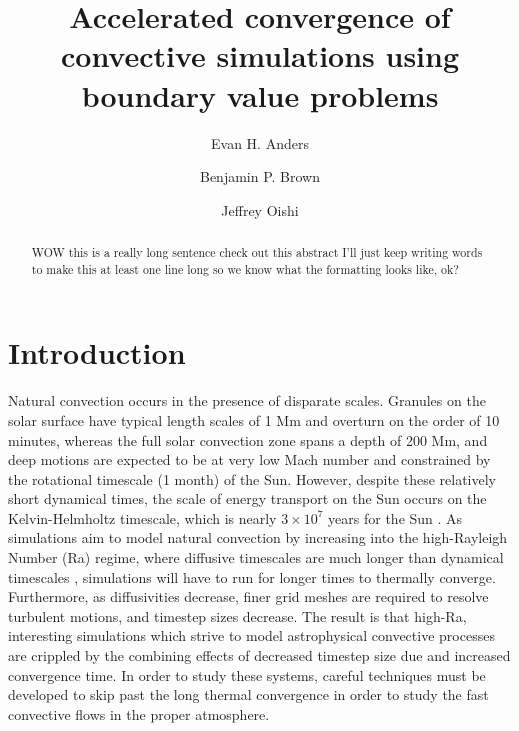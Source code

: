 \documentclass[aps, pre, onecolumn, nofootinbib, notitlepage, groupedaddress, amsfonts, amssymb, amsmath, longbibliography]{revtex4-1}
\begin{document}
\author{Evan H. Anders}
\author{Benjamin P. Brown}
\author{Jeffrey Oishi}
\title{Accelerated convergence of convective simulations using boundary value problems}

\begin{abstract}
WOW this is a really long sentence check out this abstract I'll just keep writing words to make this at least
one line long so we know what the formatting looks like, ok?
\end{abstract}
\maketitle


\section{Introduction}
\label{sec:intro}
Natural convection occurs in the presence of disparate scales. Granules on the
solar surface have typical length scales of 1 Mm and overturn on the order of 10 minutes, whereas
the full solar convection zone spans a depth of 200 Mm, and deep motions are expected to be at very
low Mach number and constrained by the rotational timescale (1 month) of the Sun.  
However, despite these relatively short dynamical times, the scale of energy transport on the
Sun occurs on the Kelvin-Helmholtz timescale, which is nearly $3 \times 10^7$ years for the
Sun \cite{stix2003}. As simulations aim to model natural convection
by increasing into the high-Rayleigh Number (Ra) regime, where diffusive timescales are much
longer than dynamical timescales \cite{Anders&Brown2017}, simulations will have to run for longer
times to thermally converge.  Furthermore, as diffusivities decrease, finer grid meshes are required
to resolve turbulent motions, and timestep sizes decrease.  The result is that high-Ra, interesting
simulations which strive to model astrophysical convective processes are crippled by the combining effects
of decreased timestep size due and increased convergence time. In order to study these systems, careful
techniques must be developed to skip past the long thermal convergence in order to study the fast convective
flows in the proper atmosphere.
\end{document}
